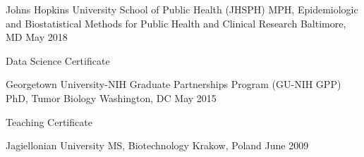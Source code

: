 \vspace{0.2cm}
\begin{cventries}
  \cventry
    {Johns Hopkins University School of Public Health (JHSPH)} %
    {MPH, Epidemiologic and Biostatistical Methods for Public Health and Clinical Research} %
    {Baltimore, MD} %
    {May 2018} %
    {
      \begin{cvitems}
        \item {Data Science Certificate}
      \end{cvitems}
    }

  \cventry
    {Georgetown University-NIH Graduate Partnerships Program (GU-NIH GPP)} %
    {PhD, Tumor Biology} %
    {Washington, DC} %
    {May 2015} %
    {
      \begin{cvitems}
        \item {Teaching Certificate}
      \end{cvitems}
    }

  \cventry
    {Jagiellonian University} %
    {MS, Biotechnology} %
    {Krakow, Poland} %
    {June 2009} %
    {} 


\end{cventries}
